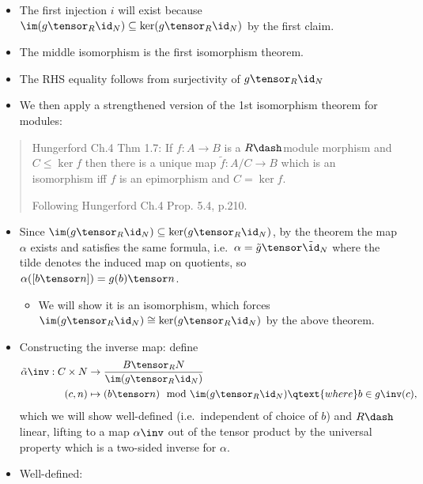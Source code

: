 \begin{itemize}
\begin{itemize}
    \begin{center}
    \end{center}
  \item
    The first injection \(i\) will exist because
    \(\im(g\tensor_R \id_N) \subseteq \ker(g\tensor_R \id_N)\) by the
    first claim.
  \item
    The middle isomorphism is the first isomorphism theorem.
  \item
    The RHS equality follows from surjectivity of \(g\tensor_R \id_N\)
  \item
    We then apply a strengthened version of the 1st isomorphism theorem
    for modules:
  \end{itemize}

  \begin{quote}
  Hungerford Ch.4 Thm 1.7: If \(f:A\to B\) is a \(R\dash\)module
  morphism and \(C\leq \ker f\) then there is a unique map
  \(\tilde f: A/C\to B\) which is an isomorphism iff \(f\) is an
  epimorphism and \(C = \ker f\).

  Following Hungerford Ch.4 Prop. 5.4, p.210.
  \end{quote}

  \begin{itemize}
  \item
    Since \(\im(g\tensor_R \id_N)\subseteq \ker(g\tensor_R \id_N)\), by
    the theorem the map \(\alpha\) exists and satisfies the same
    formula, i.e.~\(\alpha = \tilde g \tensor \tilde \id_N\) where the
    tilde denotes the induced map on quotients, so
    \(\alpha([b\tensor n]) = g(b)\tensor n\).

    \begin{itemize}
    \tightlist
    \item
      We will show it is an isomorphism, which forces
      \(\im(g\tensor_R \id_N) \cong \ker(g\tensor_R \id_N)\) by the
      above theorem.
    \end{itemize}
  \item
    Constructing the inverse map: define \begin{align*}
    \tilde \alpha\inv: C\times N &\to {B\tensor_R N \over \im(g\tensor_R \id_N) } \\
    (c, n) &\mapsto (b \tensor n)  \mod \im(g\tensor_R \id_N) \qtext{where} b \in g\inv(c)
    ,\end{align*} which we will show well-defined (i.e.~independent of
    choice of \(b\)) and \(R\dash\)linear, lifting to a map
    \(\alpha\inv\) out of the tensor product by the universal property
    which is a two-sided inverse for \(\alpha\).
  \item
    Well-defined:


\end{itemize}
\end{itemize}
